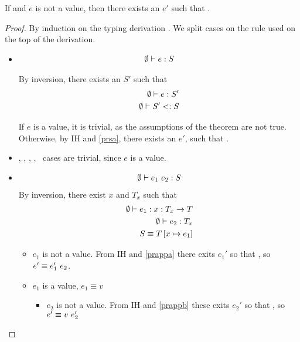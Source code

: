 
\begin{theorem}[Progress]
	If  and $e$ is not a value, 
	then there exists an $e'$ such that .
\end{theorem}
	
\begin{proof}
By induction on the typing derivation .
We split cases on the rule used on the top of the derivation.

\begin{itemize}
	\item\tsub 

\begin{align*}
\emptyset \vdash e : S
\end{align*}

By inversion, there exists an $S'$ such that 
\begin{align}
\emptyset \vdash e : S' 	\label{prsa}\\
{\emptyset}\vdash {S'}<:{S}		\label{prsb}
\end{align}

If $e$ is a value, it is trivial, as the assumptions of the theorem are not true.
Otherwise, by IH and \ref{prsa}, there exists an $e'$, such that .


\item	{}, 
		, 
		\tconst, 
		,
		\tgen\
cases are trivial, since $e$ is a value.


\item {}
\begin{align*}
\emptyset \vdash {e_1} \ {e_2} : S 
\end{align*}
By inversion, there exist $x$ and $T_x$ such that 
\begin{align}
\emptyset \vdash e_1 : x : T_x \rightarrow T 		\label{prappa}\\
\emptyset \vdash e_2 : T_x					\label{prappb}\\
S \equiv T \left[ x \mapsto e_1 \right] 					\label{prappc}
\end{align}

\begin{itemize}
	\item $e_1$ is not a value.
	From IH and \ref{prappa}
	there exits $e_1'$ so that , so $e' \equiv {e_1'} \ {e_2}$.

	\item $e_1$ is a value, $e_1 \equiv v$
	\begin{itemize}
		\item $e_2$ is not a value.
		From IH and \ref{prappb} these exits $e_2'$ so that , 
		so $e' \equiv {v} \ {e_2'}$
		

\end{itemize}
\end{itemize}
\end{itemize}
\end{proof}
